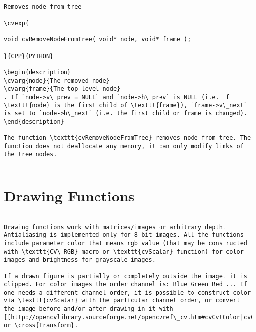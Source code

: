 \label{RemoveNodeFromTree}
\begin{verbatim}

Removes node from tree

\cvexp{

void cvRemoveNodeFromTree( void* node, void* frame );

}{CPP}{PYTHON}

\begin{description}
\cvarg{node}{The removed node}
\cvarg{frame}{The top level node}
. If `node->v\_prev = NULL` and `node->h\_prev` is NULL (i.e. if \texttt{node} is the first child of \texttt{frame}), `frame->v\_next` is set to `node->h\_next` (i.e. the first child or frame is changed).
\end{description}

The function \texttt{cvRemoveNodeFromTree} removes node from tree. The function does not deallocate any memory, it can only modify links of the tree nodes.


\end{verbatim}
\section{Drawing Functions}
\begin{verbatim}

Drawing functions work with matrices/images or arbitrary depth. Antialiasing is implemented only for 8-bit images. All the functions include parameter color that means rgb value (that may be constructed with \texttt{CV\_RGB} macro or \texttt{cvScalar} function) for color images and brightness for grayscale images.

If a drawn figure is partially or completely outside the image, it is clipped. For color images the order channel is: Blue Green Red ... If one needs a different channel order, it is possible to construct color via \texttt{cvScalar} with the particular channel order, or convert the image before and/or after drawing in it with [[http://opencvlibrary.sourceforge.net/opencvref\_cv.htm#cvCvtColor|cvCvtColor]] or \cross{Transform}.


\end{verbatim}
